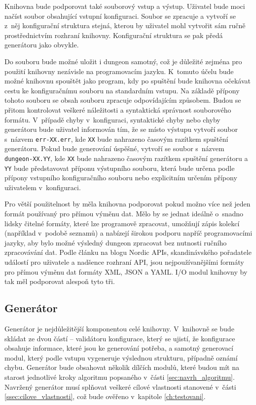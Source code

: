 Knihovna bude podporovat také souborový vstup a výstup.
Uživatel bude moci načíst soubor obsahující vstupní konfiguraci.
Soubor se zpracuje a vytvoří se z~něj konfigurační struktura stejná, kterou by uživatel mohl vytvořit sám ručně prostřednictvím rozhraní knihovny.
Konfigurační struktura se pak předá generátoru jako obvykle.
\par
Do souboru bude možné uložit i dungeon samotný, což je důležité zejména pro použití knihovny nezávisle na programovacím jazyku.
K~tomuto účelu bude možné knihovnu spouštět jako program, kdy po spuštění bude knihovna očekávat cestu ke konfiguračnímu souboru na standardním vstupu.
Na základě přípony tohoto souboru se obsah souboru zpracuje odpovídajícím způsobem.
Budou se přitom kontrolovat veškeré náležitosti a syntaktická správnost souborového formátu.
V~případě chyby v~konfiguraci, syntaktické chyby nebo chyby generátoru bude uživatel informován tím, že se místo výstupu vytvoří soubor s~názvem \texttt{err-XX.err}, kde \texttt{XX} bude nahrazeno časovým razítkem spuštění generátoru.
Pokud bude generování úspěšné, vytvoří se soubor s~názvem \texttt{dungeon-XX.YY}, kde \texttt{XX} bude nahrazeno časovým razítkem spuštění generátoru a \texttt{YY} bude představovat příponu výstupního souboru, která bude určena podle přípony vstupního konfiguračního souboru nebo explicitním určením přípony uživatelem v~konfiguraci.
\par
Pro větší použitelnost by měla knihovna podporovat pokud možno více než jeden formát používaný pro přímou výměnu dat.
Mělo by se jednat ideálně o~snadno lidsky čitelné formáty, které lze programově zpracovat, umožňují zápis kolekcí (například v~podobě seznamů) a nabízejí širokou podporu napříč programovacími jazyky, aby bylo možné výsledný dungeon zpracovat bez nutnosti ručního zpracovávání dat.
Podle článku na blogu Nordic APIs, skandinávského pořadatele událostí pro uživatele a nadšence rozhraní API, jsou nejpoužívanějšími formáty pro přímou výměnu dat formáty XML, JSON a YAML\cite{lit:file_formats}.
I/O modul knihovny by tak měl podporovat alespoň tyto tři.


\subsection{Generátor}


Generátor je nejdůležitější komponentou celé knihovny.
V~knihovně se bude skládat ze dvou částí -- validátoru konfigurace, který se ujistí, že konfigurace obsahuje informace, které jsou ke generování potřeba, a samotný generovací modul, který podle vstupu vygeneruje výslednou strukturu, případně oznámí chybu.
Generátor bude obsahovat několik dílčích modulů, které budou mít na starost jednotlivé kroky algoritmu popsaného v~části \ref{sec:navrh_algoritmu}.
Navržený generátor musí splňovat veškeré cílové vlastnosti stanovené v~části \ref{ssec:cilove_vlastnosti}, což bude ověřeno v~kapitole \ref{ch:testovani}.

